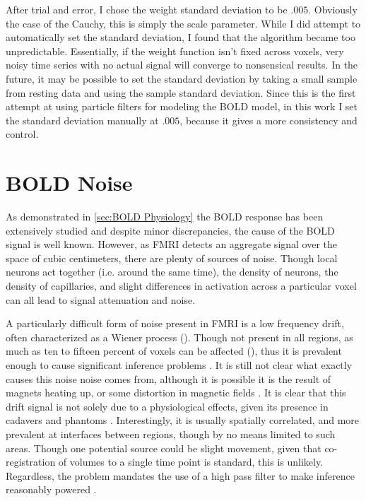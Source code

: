 After trial and error, I chose the weight standard deviation to be $.005$. Obviously
the case of the Cauchy, this is simply the scale parameter. While I 
did attempt to automatically set the standard deviation, I found that the algorithm
became too unpredictable. Essentially, if the weight function isn't
fixed across voxels, very noisy time series with no actual signal will 
converge to nonsensical results. 
In the future, it may be possible to set the standard deviation by
taking a small sample from resting data and using the sample standard deviation.
Since this is the first attempt at using particle filters for modeling the 
BOLD model, in this work I set the standard deviation manually at $.005$,
because it gives a more consistency and control. 

\section{BOLD Noise}
\label{sec:Introduction Noise}
As demonstrated in \autoref{sec:BOLD Physiology} the BOLD response has been
extensively studied and despite minor discrepancies, the cause of the BOLD 
signal is well known. However, as FMRI detects an  
aggregate signal over the space of cubic centimeters, there are
plenty of sources of noise. Though local neurons act
together (i.e. around the same time), the density of neurons, the
density of capillaries, and slight differences in activation across 
a particular voxel can all lead to signal attenuation and noise. 

A particularly difficult form of noise present in FMRI is a low frequency
drift, often characterized as a Wiener process (\cite{Riera2004}). 
Though not present in all regions, as much as ten to fifteen percent
of voxels can be affected (\cite{Tanabe2002}), thus it is prevalent enough to cause significant
inference problems \cite{Smith2007}. It is still not
clear what exactly causes this noise noise comes from, although it is possible it is 
the result of magnets heating up, or some distortion in magnetic
fields \cite{Smith2007}. It is clear that this drift signal is not solely
due to a physiological effects, given its presence in cadavers and phantoms 
\cite{Smith1999}. Interestingly, it is usually spatially correlated, and
more prevalent at interfaces between regions, though 
by no means limited to such areas. Though one potential source
could be slight movement, given that co-registration of volumes to a single time
point is standard, this is unlikely. Regardless, the problem mandates
the use of a high pass filter to make inference reasonably powered
\cite{Smith2007}.

